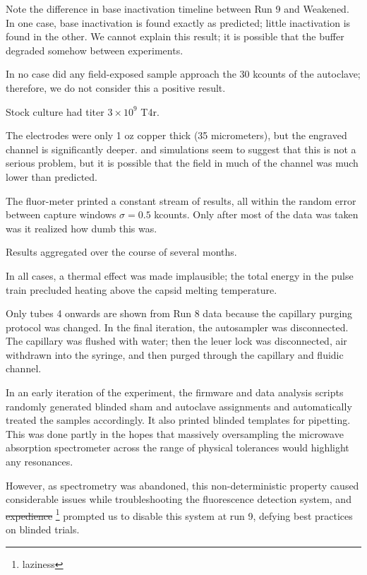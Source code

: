 \documentclass[paper.tex]{subfiles}
\begin{document}
\begin{multicols}{1}
Note the difference in base inactivation timeline between Run 9 and Weakened. In one case, base inactivation is found exactly as predicted; little inactivation is found in the other. We cannot explain this result; it is possible that the buffer degraded somehow between experiments.

In no case did any field-exposed sample approach the 30 kcounts of the autoclave; therefore, we do not consider this a positive result.

Stock culture had titer $3\times 10^9$ T4r.

The electrodes were only 1 oz copper thick (35 micrometers), but the engraved channel is significantly deeper. 
\cite{Nanosecond2006} and simulations seem to suggest that this is not a serious problem, but it is possible that the field in much of the channel was much lower than predicted.

The fluor-meter printed a constant stream of results, all within the random error between capture windows $\sigma=0.5$ kcounts. Only after most of the data was taken was it realized how dumb this was.

Results aggregated over the course of several months.

In all cases, a thermal effect was made implausible; the total energy in the pulse train precluded heating above the capsid melting temperature\cite{Effects1951}.

Only tubes 4 onwards are shown from Run 8 data because the capillary purging protocol was changed. In the final iteration, the autosampler was disconnected. The capillary was flushed with water; then the leuer lock was disconnected, air withdrawn into the syringe, and then purged through the capillary and fluidic channel.

In an early iteration of the experiment, the firmware and data analysis scripts randomly generated blinded sham and autoclave assignments and automatically treated the samples accordingly. It also printed blinded templates for pipetting. This was done partly in the hopes that massively oversampling the microwave absorption spectrometer across the range of physical tolerances would highlight any resonances.\cite{first2000} 

However, as spectrometry was abandoned, this non-deterministic property caused considerable issues while troubleshooting the fluorescence detection system, and \st{expedience} \footnote{laziness} prompted us to disable this system at run 9, defying best practices on blinded trials.


\end{multicols}
\end{document}
